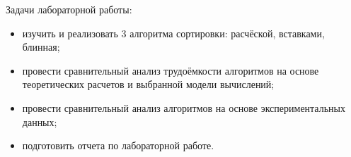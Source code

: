 Задачи лабораторной работы:
\begin{itemize}
	\item изучить и реализовать 3 алгоритма сортировки: расчёской, вставками, блинная;
	\item провести сравнительный анализ трудоёмкости алгоритмов на основе теоретических расчетов и выбранной модели вычислений;
	\item провести сравнительный анализ алгоритмов на основе экспериментальных данных;
    \item подготовить отчета по лабораторной работе.
\end{itemize}
